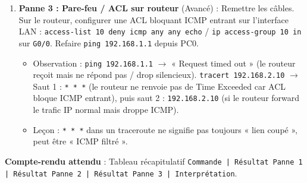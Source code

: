 \documentclass[11pt]{article}
\begin{document}
\begin{experience}
\begin{enumerate}
      \begin{itemize}
      \item Observation : \texttt{ping 127.0.0.1} OK. \texttt{ping 192.168.1.1} $\rightarrow$ \textbf{Échec} (la GW est de l'autre côté du câble coupé !). \texttt{ping 192.168.2.10} $\rightarrow$ Échec.
      \item \texttt{tracert 192.168.2.10} $\rightarrow$ S'arrête au saut 1 (\texttt{192.168.1.1} ne répond plus) ou « Destination host unreachable » depuis PC0.
      \item Conclusion : Panne sur le lien d'interconnexion (uplink) ou routeur down.
      \end{itemize}
\item \textbf{Panne 3 : Pare-feu / ACL sur routeur} (Avancé) : Remettre les câbles. Sur le routeur, configurer une ACL bloquant ICMP entrant sur l'interface LAN : \texttt{access-list 10 deny icmp any any echo} / \texttt{ip access-group 10 in} sur \texttt{G0/0}. Refaire \texttt{ping 192.168.1.1} depuis PC0.
      \begin{itemize}
      \item Observation : \texttt{ping 192.168.1.1} $\rightarrow$ « Request timed out » (le routeur reçoit mais ne répond pas / drop silencieux). \texttt{tracert 192.168.2.10} $\rightarrow$ Saut 1 : \texttt{* * *} (le routeur ne renvoie pas de Time Exceeded car ACL bloque ICMP entrant), puis saut 2 : \texttt{192.168.2.10} (si le routeur forward le trafic IP normal mais droppe ICMP).
      \item Leçon : \texttt{* * *} dans un traceroute ne signifie pas toujours « lien coupé », peut être « ICMP filtré ».
      \end{itemize}
\end{enumerate}
\textbf{Compte-rendu attendu} : Tableau récapitulatif \texttt{Commande | Résultat Panne 1 | Résultat Panne 2 | Résultat Panne 3 | Interprétation}.
\end{experience}
\end{document}
